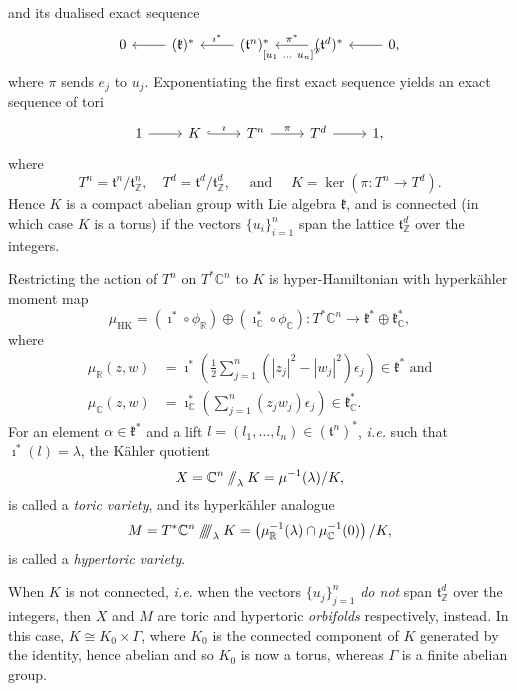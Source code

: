 \documentclass{article}
\newcommand{\ie}{\emph{i.e.} }
\newcommand{\ra}{\rightarrow}
\newcommand{\e}{\epsilon}
\newcommand{\RR}{\mathbb{R}}
\newcommand{\CC}{\mathbb{C}}
\newcommand{\ZZ}{\mathbb{Z}}
\newcommand{\mfk}{\mathfrak{k}}
\newcommand{\mft}{\mathfrak{t}}
\newcommand{\sslash}{\mathbin{/\mkern-6mu/}}
\newcommand{\sssslash}{\mathbin{/\mkern-6mu/\mkern-6mu/\mkern-6mu/}}
\newcommand{\tuple}[2]{(#1, \ldots, #2)}
\newcommand{\half}{\frac{1}{2}}
\DeclareMathOperator{\HK}{HK}
\begin{document}
	and its dualised exact sequence
	\[
		\begin{tikzcd}[ampersand replacement=\&]
			0 \& \ar[l]	(\mfk)^{\ast} \& \ar[l, "\imath^{\ast}", swap] (\mft^{n})^{\ast} \& \arrow{l}{[u_{1}\ \ldots \ u_{n}]^{T}}[swap]{\pi^{\ast}} (\mft^{d})^{\ast} \& \ar[l] 0,
		\end{tikzcd}
	\]
	where $\pi$ sends $e_{j}$ to $u_{j}$. Exponentiating the first exact sequence yields an exact sequence of tori
	\[
		\begin{tikzcd}[ampersand replacement=\&]
			1 \ar[r] \&	K \ar[r, hook, "\imath"] \& T^{n} \arrow{r}{\pi} \& T^{d} \ar[r] \& 1,
		\end{tikzcd}
	\]
	where 
	\[
		T^{n} = \mft^{n}/\mft_{\ZZ}^{n}, \quad T^{d} = \mft^{d}/\mft_{\ZZ}^{d}, \quad \text{ and } \quad K = \ker(\pi : T^{n} \ra T^{d}).
	\]
	Hence $K$ is a compact abelian group with Lie algebra $\mfk$, and is connected (in which case $K$ is a torus) if the vectors $\{u_{i}\}_{i=1}^{n}$ span the lattice $\mft_{\ZZ}^{d}$ over the integers.
	
	Restricting the action of $T^{n}$ on $T^{\ast}\CC^{n}$ to $K$ is hyper-Hamiltonian with hyperk\"ahler moment map
	\[
		\mu_{\HK} = (\imath^{\ast} \circ \phi_{\RR}) \oplus (\imath_{\CC}^{\ast} \circ \phi_{\CC}) : T^{\ast}\CC^{n} \ra \mfk^{\ast} \oplus \mfk_{\CC}^{\ast},
	\]
	where
	\begin{align*}%
		\mu_{\RR}(z,w) &= \imath^{\ast}\left( \half \sum_{j=1}^{n}(|z_{j}|^{2} - |w_{j}|^{2})\e_{j} \right) \in \mfk^{\ast}
		\mbox{ and}\\
		\mu_{\CC}(z,w) &= \imath_{\CC}^{\ast} \left(\sum_{j=1}^{n}(z_{j}w_{j})\e_{j} \right) \in \mfk_{\CC}^{\ast}.
	\end{align*}
	For an element $\alpha\in \mfk^{\ast}$ and a lift $l = \tuple{l_{1}}{l_{n}} \in (\mft^{n})^{\ast}$, \ie such that $\imath^{\ast}(l) = \lambda$, the K\"ahler quotient
	\[
		X = \CC^{n} \sslash_{\lambda} K = \mu^{-1}(\lambda)/K,
	\]
	is called a \emph{toric variety}, and its hyperk\"ahler analogue
	\[
		M = T^{\ast}\CC^{n} \sssslash_{\lambda} K = \left(\mu_{\RR}^{-1}(\lambda) \cap \mu_{\CC}^{-1}(0)\right)/ K,
	\]
	is called a \emph{hypertoric variety}.
	
	When $K$ is not connected, \ie when the vectors $\{u_{j}\}_{j=1}^{n}$ \emph{do not} span $\mft_{\ZZ}^{d}$ over the integers, then $X$ and $M$ are toric and hypertoric \emph{orbifolds} respectively, instead. In this case, $K \cong K_{0} \times \Gamma$, where $K_{0}$ is the connected component of $K$ generated by the identity, hence abelian and so $K_{0}$ is now a torus, whereas $\Gamma$ is a finite abelian group.
	
\end{document}
